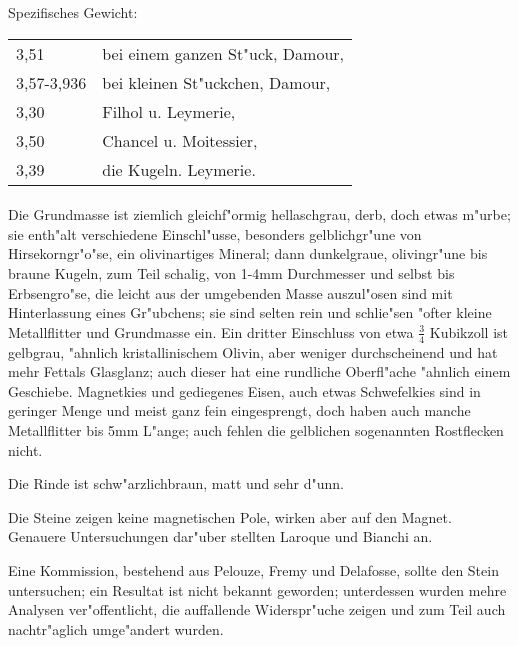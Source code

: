\documentclass[a4paper, 11pt, oneside]{article}
\begin{document}
Spezifisches Gewicht:  
\begin{table}[!ht]
    \centering
    \begin{tabular}{l l}
        3,51 & bei einem ganzen St"uck, Damour,\\
        3,57-3,936 & bei kleinen St"uckchen, Damour,\\
        3,30 & Filhol u. Leymerie,\\
        3,50 & Chancel u. Moitessier,\\
        3,39 & die Kugeln. Leymerie.
    \end{tabular}
\end{table}
\paragraph{}
Die Grundmasse ist ziemlich gleichf"ormig hellaschgrau, derb, doch etwas m"urbe; sie enth"alt verschiedene Einschl"usse, besonders gelblichgr"une von Hirsekorngr"o"se, ein olivinartiges Mineral; dann dunkelgraue, olivingr"une bis braune Kugeln, zum Teil schalig, von 1-4mm Durchmesser und selbst bis Erbsengro"se, die leicht aus der umgebenden Masse auszul"osen sind mit Hinterlassung eines Gr"ubchens; sie sind selten rein und schlie"sen "ofter kleine Metallflitter und Grundmasse ein. Ein dritter Einschluss von etwa $\frac{3}{4}$ Kubikzoll ist gelbgrau, "ahnlich kristallinischem Olivin, aber weniger durchscheinend und hat mehr Fettals Glasglanz; auch dieser hat eine rundliche Oberfl"ache "ahnlich einem Geschiebe. Magnetkies und gediegenes Eisen, auch etwas Schwefelkies sind in geringer Menge und meist ganz fein eingesprengt, doch haben auch manche Metallflitter bis 5mm L"ange; auch fehlen die gelblichen sogenannten Rostflecken nicht.

Die Rinde ist schw"arzlichbraun, matt und sehr d"unn.

Die Steine zeigen keine magnetischen Pole, wirken aber auf den Magnet. Genauere Untersuchungen dar"uber stellten Laroque und Bianchi an.

Eine Kommission, bestehend aus Pelouze, Fremy und Delafosse, sollte den Stein untersuchen; ein Resultat ist nicht bekannt geworden; unterdessen wurden mehre Analysen ver"offentlicht, die auffallende Widerspr"uche zeigen und zum Teil auch nachtr"aglich umge"andert wurden.
\end{document}
